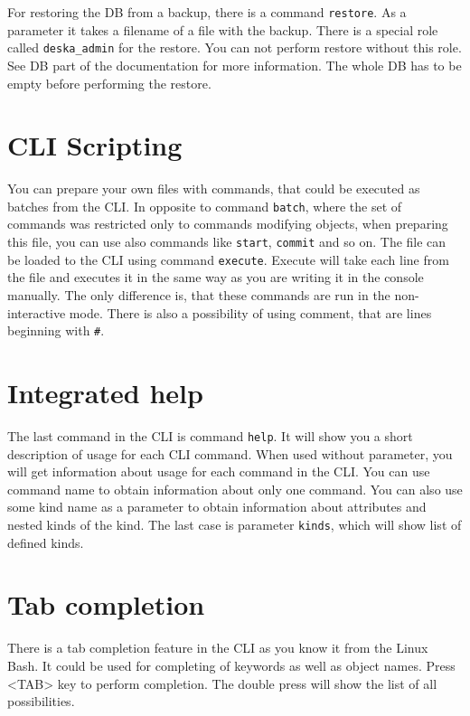\documentclass[deska]{subfiles}
\begin{document}
For restoring the DB from a backup, there is a command {\tt restore}. As a parameter it takes a filename of a file with
the backup. There is a special role called {\tt deska\_admin} for the restore. You can not perform restore without this
role. See DB part of the documentation for more information. The whole DB has to be empty before performing the restore.

\section{CLI Scripting}

You can prepare your own files with commands, that could be executed as batches from the CLI. In opposite to command
{\tt batch}, where the set of commands was restricted only to commands modifying objects, when preparing this file, you
can use also commands like {\tt start}, {\tt commit} and so on. The file can be loaded to the CLI using command
{\tt execute}. Execute will take each line from the file and executes it in the same way as you are writing it in the
console manually. The only difference is, that these commands are run in the non-interactive mode. There is also a
possibility of using comment, that are lines beginning with {\tt \#}.

\section{Integrated help}

The last command in the CLI is command {\tt help}. It will show you a short description of usage for each CLI command.
When used without parameter, you will get information about usage for each command in the CLI. You can use command name
to obtain information about only one command. You can also use some kind name as a parameter to obtain information about
attributes and nested kinds of the kind. The last case is parameter {\tt kinds}, which will show list of defined kinds.

\section{Tab completion}

There is a tab completion feature in the CLI as you know it from the Linux Bash. It could be used for completing of
keywords as well as object names. Press <TAB> key to perform completion. The double press will show the list of all
possibilities.

\end{document}
